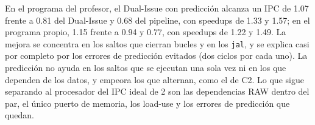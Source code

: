 \documentclass[12pt,a4paper]{article}
\begin{document}
En el programa del profesor, el Dual-Issue con predicción alcanza un IPC de 1.07 frente a 0.81 del Dual-Issue y 0.68 del pipeline, con speedups de 1.33 y 1.57; en el programa propio, 1.15 frente a 0.94 y 0.77, con speedups de 1.22 y 1.49. La mejora se concentra en los saltos que cierran bucles y en los \texttt{jal}, y se explica casi por completo por los errores de predicción evitados (dos ciclos por cada uno). La predicción no ayuda en los saltos que se ejecutan una sola vez ni en los que dependen de los datos, y empeora los que alternan, como el de C2. Lo que sigue separando al procesador del IPC ideal de 2 son las dependencias RAW dentro del par, el único puerto de memoria, los load-use y los errores de predicción que quedan.
\end{document}
